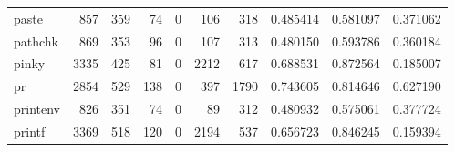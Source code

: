 \begin{longtable}{lrrrrrrrrr}
paste     &                                 857 &                                             359 &                                             74 &                                             0 &                                            106 &                                          318 &                                           0.485414 &                               0.581097 &                             0.371062 \\
pathchk   &                                 869 &                                             353 &                                             96 &                                             0 &                                            107 &                                          313 &                                           0.480150 &                               0.593786 &                             0.360184 \\
pinky     &                                3335 &                                             425 &                                             81 &                                             0 &                                           2212 &                                          617 &                                           0.688531 &                               0.872564 &                             0.185007 \\
pr        &                                2854 &                                             529 &                                            138 &                                             0 &                                            397 &                                         1790 &                                           0.743605 &                               0.814646 &                             0.627190 \\
printenv  &                                 826 &                                             351 &                                             74 &                                             0 &                                             89 &                                          312 &                                           0.480932 &                               0.575061 &                             0.377724 \\
printf    &                                3369 &                                             518 &                                            120 &                                             0 &                                           2194 &                                          537 &                                           0.656723 &                               0.846245 &                             0.159394 \\

\end{longtable}

